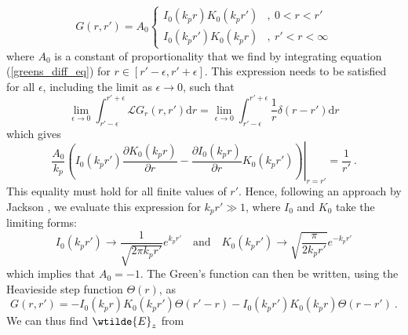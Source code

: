 \begin{equation}
G\left(r,r'\right)=A_0\left\{ \begin{array}{ll}
I_0(k_pr)K_0(k_pr') &,~ 0<r<r'\\
I_0(k_pr')K_0(k_pr)  &,~ r'<r<\infty
\end{array}\right.
\end{equation}
where $A_0$ is a constant of proportionality that we find by integrating %
equation (\ref{greens_diff_eq}) for $r\in\left[r'-\epsilon, r'+\epsilon \right]$. This expression needs to be satisfied for all $\epsilon$, including the limit as $\epsilon\to 0$, such that
\begin{equation}
\lim_{\epsilon\to 0}\int_{r'-\epsilon}^{r'+\epsilon}\mathscr{L}G_r(r,r')\mathrm{d}r= \lim_{\epsilon\to 0}\int_{r'-\epsilon}^{r'+\epsilon}\frac{1}{r}\delta(r-r')\mathrm{d}r
 \end{equation}
 which gives  %
 \begin{equation}
 \frac{A_0}{k_p} \left.\left(I_0(k_pr')\frac{\partial K_0(k_pr)}{\partial r}-\frac{\partial I_0(k_pr)}{\partial r}K_0(k_pr')\right)\right|_{r=r'} =\frac{1}{r'}~.
 \end{equation}
This equality must hold for all finite values of $r'$. Hence, following an approach by Jackson \citep{Jackson1962}, we evaluate this expression for $k_pr'\gg 1$, where $I_0$ and $K_0$ take the limiting forms: 
\begin{equation}
I_0(k_pr')\to \frac{1}{\sqrt{2\pi k_pr'}}e^{k_pr'} \quad \text{and} \quad K_0(k_pr')\to \sqrt{\frac{\pi}{2k_pr'}}e^{-k_pr'}
\end{equation}
which implies that $A_0=-1$. The Green's function can then be written, using the Heavieside step function $\Theta(r)$, as %
\begin{equation}
G\left(r,r'\right)=- I_0(k_pr)K_0(k_pr')\Theta(r'-r)-I_0(k_pr')K_0(k_pr)\Theta(r-r')~.
\end{equation}
We can thus find $\wtilde{E}_z$ from 
